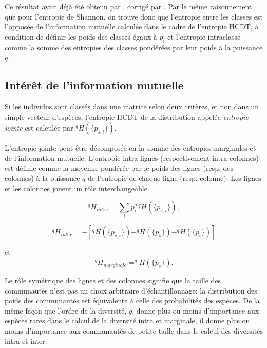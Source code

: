 \documentclass[
  11pt,
  french,
  a4paper,
  extrafontsizes,onecolumn,openright
  ]{memoir}
\begin{document}
Ce résultat avait déjà été obtenu par \textcite{Suyari2004}, corrigé par \textcite{Ilic2013}.
Par le même raisonnement que pour l'entropie de Shannon, on trouve donc que l'entropie entre les classes est l'opposée de l'information mutuelle calculée dans le cadre de l'entropie HCDT, à condition de définir les poids des classes égaux à \(p_i\) et l'entropie intraclasse comme la somme des entropies des classes pondérées par leur poids à la puissance \(q\).

\subsection{Intérêt de l'information mutuelle}\label{intuxe9ruxeat-de-linformation-mutuelle}

Si les individus sont classés dans une matrice selon deux critères, et non dans un simple vecteur d'espèces, l'entropie HCDT de la distribution appelée \emph{entropie jointe} est calculée par \(^{q}\!H(\{p_{s,i}\})\).

L'entropie jointe peut être décomposée en la somme des entropies marginales et de l'information mutuelle.
L'entropie intra-lignes (respectivement intra-colonnes) est définie comme la moyenne pondérée par le poids des lignes (resp. des colonnes) à la puissance \(q\) de l'entropie de chaque ligne (resp. colonne).
Les lignes et les colonnes jouent un rôle interchangeable.

\begin{equation}
  \label{eq:Hqintra}
  ^q\!H_{\mathit{intra}}
  = \sum_i{p^q_{i}\,{^{q}\!H(\{p_{s,i}\})}},
\end{equation}

\begin{equation}
  \label{eq:Hqinter}
  ^q\!H_{\mathit{inter}}
  =-\left[^{q}\!H\left(\{p_{s,i}\}\right) - ^{q}\!H\left(\{p_{s}\}\right) - ^{q}\!H\left(\{p_{i}\}\right)\right]
\end{equation}

et
\begin{equation}
  \label{eq:Hqmarginale}
  ^q\!H_{\mathit{marginale}} = ^{q}\!H\left(\{p_{s}\}\right).
\end{equation}

Le rôle symétrique des lignes et des colonnes signifie que la taille des communautés n'est pas un choix arbitraire d'échantillonnage: la distribution des poids des communautés est équivalente à celle des probabilités des espèces.
De la même façon que l'ordre de la diversité, \(q\), donne plus ou moins d'importance aux espèces rares dans le calcul de la diversité intra et marginale, il donne plus ou moins d'importance aux communautés de petite taille dans le calcul des diversités intra et inter.
\end{document}
